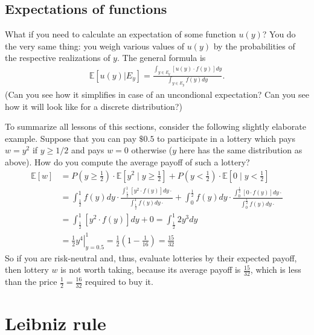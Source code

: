\documentclass{article}
\begin{document}
\subsection{Expectations of functions}

What if you need to calculate an expectation of some function $u(y)$? You do the very same thing: you weigh various values of $u(y)$ by the probabilities of the respective realizations of $y$. The general formula is
\begin{align*}
	\mathbb{E}[u(y)|E_y]
	= \frac{\int_{y \in E_y} \left[u(y) \cdot f(y)\right] dy}{\int_{y \in E_y} f(y) dy}.
\end{align*}
(Can you see how it simplifies in case of an uncondional expectation? Can you see how it will look like for a discrete distribution?)

To summarize all lessons of this sections, consider the following slightly elaborate example. Suppose that you can pay $\$0.5$ to participate in a lottery which pays $w=y^2$ if $y \geq 1/2$ and pays $w=0$ otherwise ($y$ here has the same distribution as above). How do you compute the average payoff of such a lottery?
\begin{align*}
	\mathbb{E}[w] &= P\left(y \geq \frac{1}{2}\right) \cdot \mathbb{E}\left[y^2 \mid y \geq \frac{1}{2}\right] + P\left(y < \frac{1}{2}\right) \cdot \mathbb{E}\left[0 \mid y < \frac{1}{2}\right]
	\\
	&= \int_{\frac{1}{2}}^1 f(y) dy \cdot \frac{\int_{\frac{1}{2}}^1 \left[y^2 \cdot f(y)\right] dy \cdot}{\int_{\frac{1}{2}}^1 f(y) dy \cdot} + \int_0^{\frac{1}{2}} f(y) dy \cdot \frac{\int_0^{\frac{1}{2}} \left[0 \cdot f(y)\right] dy \cdot}{\int_0^{\frac{1}{2}} f(y) dy \cdot}
	\\
	&= \int_{\frac{1}{2}}^1 \left[y^2 \cdot f(y)\right] dy + 0 = \int_{\frac{1}{2}}^1 2y^3 dy
	\\
	&= \left. \frac{1}{2}y^4 \right|_{y=0.5}^1 = \frac{1}{2} \left(1 - \frac{1}{16}\right) = \frac{15}{32}
\end{align*}
So if you are risk-neutral and, thus, evaluate lotteries by their expected payoff, then lottery $w$ is not worth taking, because its average payoff is $\frac{15}{32}$, which is less than the price $\frac{1}{2}=\frac{16}{32}$ required to buy it.




\section{Leibniz rule}
\end{document}
